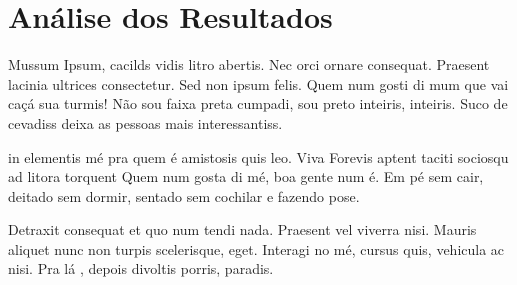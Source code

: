 \section{Análise dos Resultados}

Mussum Ipsum, cacilds vidis litro abertis. Nec orci ornare consequat. Praesent lacinia ultrices consectetur. Sed non ipsum felis. Quem num gosti di mum que vai caçá sua turmis! Não sou faixa preta cumpadi, sou preto inteiris, inteiris. Suco de cevadiss deixa as pessoas mais interessantiss.

in elementis mé pra quem é amistosis quis leo. Viva Forevis aptent taciti sociosqu ad litora torquent Quem num gosta di mé, boa gente num é. Em pé sem cair, deitado sem dormir, sentado sem cochilar e fazendo pose.

Detraxit consequat et quo num tendi nada. Praesent vel viverra nisi. Mauris aliquet nunc non turpis scelerisque, eget. Interagi no mé, cursus quis, vehicula ac nisi. Pra lá , depois divoltis porris, paradis.

